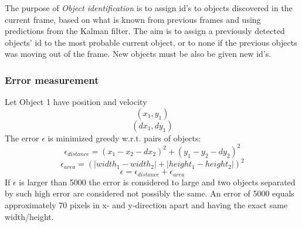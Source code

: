 The purpose of \emph{Object identification} is to assign id's to objects discovered in the current frame, based on what is known from previous frames and using predictions from the Kalman filter. The aim is to assign a previously detected objects' id to the most probable current object, or to none if the previous objects was moving out of the frame. New objects must be also be given new id's. 

\subsubsection{Error measurement}
Let Object 1 have position and velocity
\begin{equation}
(x_1, y_1)
\end{equation}
\begin{equation}
(dx_1, dy_1)
\end{equation}
The error $\epsilon$ is minimized greedy w.r.t. pairs of objects:
\begin{equation}
  \epsilon_{distance} = (x_1 - x_2 - dx_2)^2 + (y_1 - y_2 - dy_2)^2
\end{equation}
\begin{equation}
  \epsilon_{area} = (|width_1 - width_2| + |height_1 - height_2|)^2
\end{equation}
\begin{equation}
  \epsilon = \epsilon_{distance} + \epsilon_{area}
\end{equation}
If $\epsilon$ is larger than 5000 the error is considered to large and two objects separated by such high error are considered not possibly the same. An error of 5000 equals approximately 70 pixels in x- and y-direction apart and having the exact same width/height.


